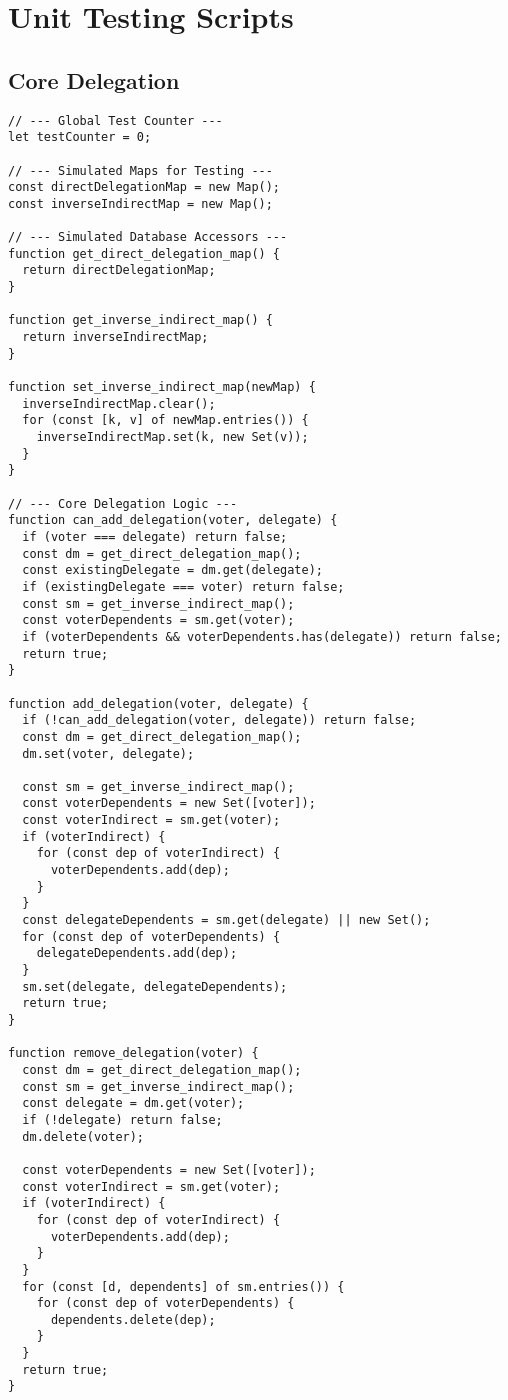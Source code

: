 \chapter{Unit Testing Scripts}\label{appendix:unit_test}
\section{Core Delegation}
\begin{verbatim}
// --- Global Test Counter ---
let testCounter = 0;

// --- Simulated Maps for Testing ---
const directDelegationMap = new Map();
const inverseIndirectMap = new Map();

// --- Simulated Database Accessors ---
function get_direct_delegation_map() {
  return directDelegationMap;
}

function get_inverse_indirect_map() {
  return inverseIndirectMap;
}

function set_inverse_indirect_map(newMap) {
  inverseIndirectMap.clear();
  for (const [k, v] of newMap.entries()) {
    inverseIndirectMap.set(k, new Set(v));
  }
}

// --- Core Delegation Logic ---
function can_add_delegation(voter, delegate) {
  if (voter === delegate) return false;
  const dm = get_direct_delegation_map();
  const existingDelegate = dm.get(delegate);
  if (existingDelegate === voter) return false;
  const sm = get_inverse_indirect_map();
  const voterDependents = sm.get(voter);
  if (voterDependents && voterDependents.has(delegate)) return false;
  return true;
}

function add_delegation(voter, delegate) {
  if (!can_add_delegation(voter, delegate)) return false;
  const dm = get_direct_delegation_map();
  dm.set(voter, delegate);

  const sm = get_inverse_indirect_map();
  const voterDependents = new Set([voter]);
  const voterIndirect = sm.get(voter);
  if (voterIndirect) {
    for (const dep of voterIndirect) {
      voterDependents.add(dep);
    }
  }
  const delegateDependents = sm.get(delegate) || new Set();
  for (const dep of voterDependents) {
    delegateDependents.add(dep);
  }
  sm.set(delegate, delegateDependents);
  return true;
}

function remove_delegation(voter) {
  const dm = get_direct_delegation_map();
  const sm = get_inverse_indirect_map();
  const delegate = dm.get(voter);
  if (!delegate) return false;
  dm.delete(voter);

  const voterDependents = new Set([voter]);
  const voterIndirect = sm.get(voter);
  if (voterIndirect) {
    for (const dep of voterIndirect) {
      voterDependents.add(dep);
    }
  }
  for (const [d, dependents] of sm.entries()) {
    for (const dep of voterDependents) {
      dependents.delete(dep);
    }
  }
  return true;
}


\end{verbatim}
